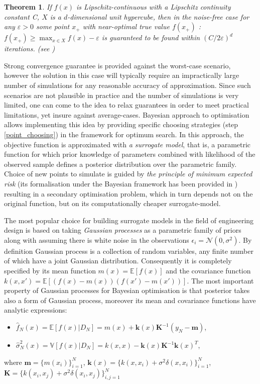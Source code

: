 \documentclass[a4paper]{jpconf}
\theoremstyle{my_theorem_style}
\newtheorem{theorem}{Theorem}
\numberwithin{equation}{section}
\begin{document}
\begin{theorem}
If $f(x)$ is Lipschitz-continuous with a Lipschitz continuity constant C, $X$ is a $d$-dimensional unit hypercube, then in the noise-free case for any $\varepsilon  > 0$ some point $x_+$ with near-optimal true value $f(x_+)$ : $f(x_+) \geq \max_{x \in X}f(x) - \varepsilon $ is guaranteed to be found within $(C/2\varepsilon)^d$ iterations. (see \cite{Betro1991})
\end{theorem}

Strong convergence guarantee is provided against the worst-case
scenario, however the solution in this case will typically require an
impractically large number of simulations for any reasonable accuracy
of approximation. Since such scenarios are not plausible in practice
and the number of simulations is very limited, one can come to the
idea to relax guarantees in order to meet practical limitations, yet insure against average-cases. 
Bayesian approach to optimisation allows implementing this idea by providing specific choosing strategies (step \ref{point_choosing}) in the framework for optimum search. In this approach, the objective function is approximated with \emph{a surrogate model}, that is, a parametric function for which prior knowledge of parameters combined with likelihood of the observed sample defines a posterior distribution over the parametric family. Choice of new points to simulate is guided by \emph{the principle of minimum expected risk} (its formalisation under the Bayesian framework has been provided in \cite{Burnaev2015}) resulting in a secondary optimisation problem, which in turn depends not on the original function, but on its computationally cheaper surrogate-model.

The most popular choice for building surrogate models in the field of engineering design is based on taking \emph{Gaussian processes} as a parametric family of priors along with assuming there is white noise in the observations $\epsilon_i = \mathcal{N}(0, \sigma^2)$. By definition \cite{rasmussen2006gaussian,Burnaev2016} Gaussian process is a collection of random variables, any finite number of which have a joint Gaussian distribution. Consequently it is completely specified by its mean function $m(x) = \mathbb{E}[f(x)]$ and the covariance function $k(x, x') = \mathbb{E}[(f(x) - m(x))(f(x') - m(x'))]$. The most important property of Gaussian processes for Bayesian optimisation is that posterior takes also a form of Gaussian process, moreover its mean and covariance functions have analytic expressions:
\begin{itemize}
\item $\hat{f}_N(x) = \mathbb{E}[f(x)|D_N] = m(x) + \mathbf{k}(x)\mathbf{K}^{-1} (y_N - \mathbf{m})$,
\item $\hat{\sigma}_N^2(x) = \mathbb{V}[f(x)|D_N] = k(x, x) - \mathbf{k}(x)\mathbf{K}^{-1}\mathbf{k}(x)^T$,
\end{itemize}
where $\mathbf{m} = \{m(x_i)\}_{i=1}^N$, $\mathbf{k}(x) = \{k(x, x_i) + \sigma^2 \delta(x, x_i)\}_{i=1}^N$, $\mathbf{K} = \{k(x_i, x_j) + \sigma^2 \delta(x_i, x_j)\}_{i,j=1}^N$
\end{document}
